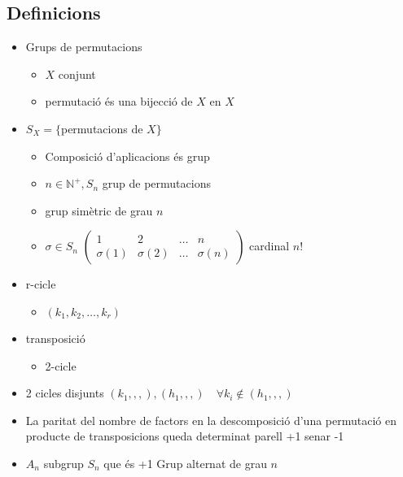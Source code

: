 \documentclass{article}
\newcommand{\N}{\mathbb{N}}
\begin{document}
\subsection*{Definicions}
\begin{itemize}
\item Grups de permutacions
	\begin{itemize}
	\item $X$ conjunt
	\item permutació és una bijecció de $X$ en $X$
	\end{itemize}
\item $S_X = \{$permutacions de $X\}$
	\begin{itemize}
	\item Composició d'aplicacions és grup
	\item $n \in \N^+, S_n$ grup de permutacions
	\item grup simètric de grau $n$
	\item $\sigma \in S_n$
		\subitem $\begin{pmatrix}1 & 2 & \dots & n\\ \sigma(1) & \sigma(2) & \dots & \sigma(n)\end{pmatrix}$ cardinal $n!$
	\end{itemize}
\item r-cicle
	\begin{itemize}
	\item $(k_1, k_2, \dots, k_r)$
	\end{itemize}
\item transposició
	\begin{itemize}
	\item 2-cicle
	\end{itemize}
\item 2 cicles disjunts
	\subitem $(k_1,,,), (h_1,,,)\quad \forall k_i \notin (h_1,,,)$
\item La paritat del nombre de factors en la descomposició d'una permutació en producte de transposicions queda determinat
	\subitem[Si] parell +1
	\subitem[Si] senar -1
\item $A_n$ subgrup $S_n$ que és +1
	\subitem Grup alternat de grau $n$
\end{itemize}

\end{document}
